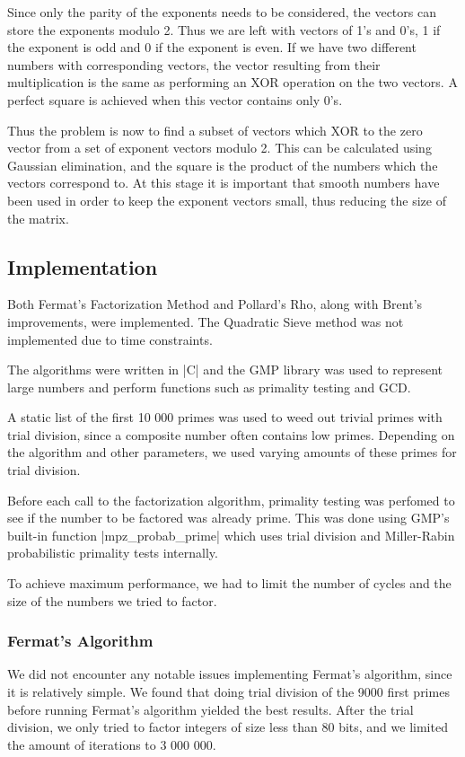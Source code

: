 \documentclass[paper=a4, fontsize=11pt,numbers=endperiod]{scrartcl} %
\numberwithin{equation}{section} %
\numberwithin{figure}{section} %
\numberwithin{table}{section} %
\begin{document}
Since only the parity of the exponents needs to be considered, the vectors can store the exponents modulo 2.
Thus we are left with vectors of 1's and 0's, 1 if the exponent is odd and 0 if the exponent is even.
If we have two different numbers with corresponding vectors, the vector resulting from their multiplication is the same as performing an XOR operation on the two vectors.
A perfect square is achieved when this vector contains only 0's.

Thus the problem is now to find a subset of vectors which XOR to the zero vector from a set of exponent vectors modulo 2.
This can be calculated using Gaussian elimination, and the square is the product of the numbers which the vectors correspond to.
At this stage it is important that smooth numbers have been used in order to keep the exponent vectors small, thus reducing the size of the matrix.


\subsection{Implementation}
Both Fermat's Factorization Method and Pollard's Rho, along with Brent's improvements, were implemented.
The Quadratic Sieve method was not implemented due to time constraints.

The algorithms were written in |C| and the GMP \cite{gmp} library was used to represent large numbers and perform functions such as primality testing and GCD.

A static list of the first 10 000 primes was used to weed out trivial primes with trial division, since a composite number often contains low primes.
Depending on the algorithm and other parameters, we used varying amounts of these primes for trial division.

Before each call to the factorization algorithm, primality testing was perfomed to see if the number to be factored was already prime.
This was done using GMP's built-in function |mpz_probab_prime| which uses trial division and Miller-Rabin probabilistic primality tests internally\cite{probabprime}.

To achieve maximum performance, we had to limit the number of cycles and the size of the numbers we tried to factor.

\subsubsection{Fermat's Algorithm}
We did not encounter any notable issues implementing Fermat's algorithm, since it is relatively simple.
We found that doing trial division of the 9000 first primes before running Fermat's algorithm yielded the best results.
After the trial division, we only tried to factor integers of size less than 80 bits, and we limited the amount of iterations to 3 000 000.
\end{document}
